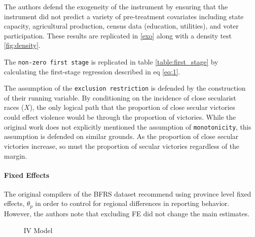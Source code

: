 \documentclass{scrartcl}
\begin{document}
The authors defend the exogeneity of the instrument by ensuring that the instrument did not predict a variety of pre-treatment covariates including state capacity, agricultural production, census data (education, utilities), and voter participation. These results are replicated in \ref{exo} along with a density test \ref{fig:density}.

The \texttt{non-zero first stage} is replicated in table \ref{table:first_stage} by calculating the first-stage regression described in eq \ref{eq:1}.

The assumption of the \texttt{exclusion restriction} is defended by the construction of their running variable.
By conditioning on the incidence of close secularist races ($X$), the only logical path that the proportion of close secular victories could effect violence would be through the proportion of victories. 
While the original work does not explicitly mentioned the assumption of \texttt{monotonicity}, this assumption is defended on similar grounds. As the proportion of close secular victories increase, so must the proportion of secular victories regardless of the margin.

\paragraph{Fixed Effects}
The original compilers of the BFRS dataset recommend using province level fixed effects, $\theta_p$ in order to control for regional differences in reporting behavior.
However, the authors note that excluding FE did not change the main estimates. 


\begin{figure}[h]
  \centering
  \caption{IV Model}
  \label{fig:ate_iv}
\end{figure}
\end{document}
